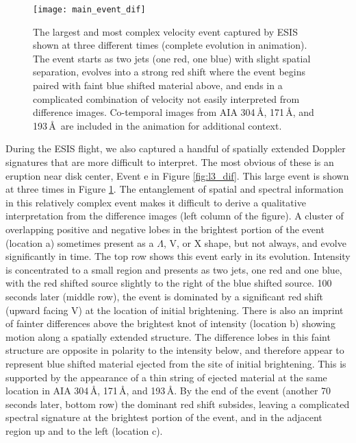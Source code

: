    	
    	\begin{figure}[htb!]
    		\texttt{[image: main\_event\_dif]}
    		\centering
    		\caption{The largest and most complex velocity event %
    		captured by ESIS shown at three different times (complete evolution in animation). The event starts as two jets (one red, one blue) with slight spatial separation, evolves into a strong red shift where the event begins paired with faint blue shifted material above, and ends in a complicated combination of velocity not easily interpreted from difference images. Co-temporal images from AIA 304\,\AA, 171\,\AA, and 193\,\AA\ are included in the animation for additional context.}
    		\label{fig:main_event}
    	\end{figure}
		
    	During the ESIS flight, we also captured a handful of spatially extended Doppler signatures that are more difficult to interpret.
    	The most obvious of these is an eruption near disk center, Event e in Figure \ref{fig:l3_dif}.
    	This large event is shown at three times in Figure \ref{fig:main_event}.
    	The entanglement of spatial and spectral information in this relatively complex event makes it difficult to derive a qualitative interpretation from the difference images (left column of the figure).
    	A cluster of overlapping positive and negative lobes in the brightest portion of the event (location a) sometimes present as a $\Lambda$, V, or X shape, but not always, and evolve significantly in time.
    	The top row shows this event early in its evolution. 
    	Intensity is concentrated to a small region and presents as two jets, one red and one blue, with the red shifted source slightly to the right of the blue shifted source. 
    	100 seconds later (middle row), the event is dominated by a significant red shift (upward facing V) at the location of initial brightening. 
    	There is also an imprint of fainter differences above the brightest knot of intensity (location b) showing motion along a spatially extended structure.
    	The difference lobes in this faint structure are opposite in polarity to the intensity below, and therefore 
    	appear to represent  blue shifted material ejected from the site of initial brightening.
    	This is supported by the appearance of a thin string of ejected material at the same location in AIA 304\,\AA, 171\,\AA, and 193\,\AA.
    	By the end of the event (another 70 seconds later, bottom row) the dominant red shift subsides, leaving a complicated spectral signature at the brightest portion of the event, and in the adjacent region up and to the left (location c).  
    	
